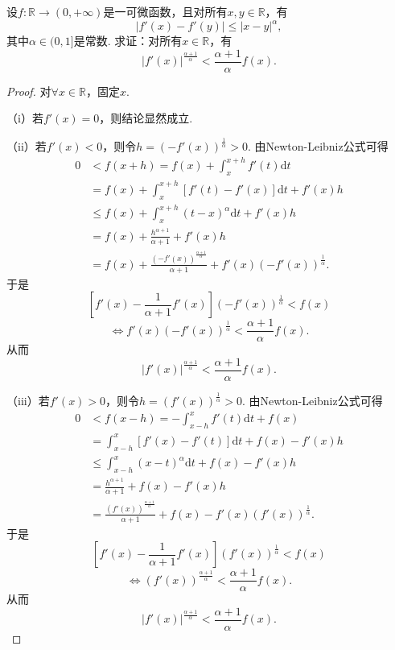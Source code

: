 \documentclass[../../main.tex]{subfiles}
\begin{document}
\begin{example}
设$f: \mathbb{R} \to (0, +\infty)$是一可微函数，且对所有$x, y \in \mathbb{R}$，有
$$|f'(x) - f'(y)| \leqslant |x - y|^\alpha,$$
其中$\alpha \in (0, 1]$是常数.
求证：对所有$x \in \mathbb{R}$，有
$$|f'(x)|^{\frac{\alpha + 1}{\alpha}} < \frac{\alpha + 1}{\alpha} f(x).$$
\end{example}
\begin{proof}
对$\forall x \in \mathbb{R}$，固定$x$.

（i）若$f'(x) = 0$，则结论显然成立.

（ii）若$f'(x) < 0$，则令$h = \left( -f'(x) \right)^{\frac{1}{\alpha}} > 0$. 由Newton-Leibniz公式可得
\begin{align*}
0 &< f(x + h) = f(x) + \int_x^{x + h} f'(t) \mathrm{d}t \\
&= f(x) + \int_x^{x + h} \left[ f'(t) - f'(x) \right] \mathrm{d}t + f'(x) h \\
&\leqslant f(x) + \int_x^{x + h} \left( t - x \right)^{\alpha} \mathrm{d}t + f'(x) h \\
&= f(x) + \frac{h^{\alpha + 1}}{\alpha + 1} + f'(x) h \\
&= f(x) + \frac{\left( -f'(x) \right)^{\frac{\alpha + 1}{\alpha}}}{\alpha + 1} + f'(x) \left( -f'(x) \right)^{\frac{1}{\alpha}}.
\end{align*}
于是
$$\left[ f'(x) - \frac{1}{\alpha + 1} f'(x) \right] \left( -f'(x) \right)^{\frac{1}{\alpha}} < f(x)$$
$$\Longleftrightarrow f'(x) \left( -f'(x) \right)^{\frac{1}{\alpha}} < \frac{\alpha + 1}{\alpha} f(x).$$
从而
$$\left| f'(x) \right|^{\frac{\alpha + 1}{\alpha}} < \frac{\alpha + 1}{\alpha} f(x).$$

（iii）若$f'(x) > 0$，则令$h = \left( f'(x) \right)^{\frac{1}{\alpha}} > 0$. 由Newton-Leibniz公式可得
\begin{align*}
0 &< f(x - h) = -\int_{x - h}^x f'(t) \mathrm{d}t + f(x) \\
&= \int_{x - h}^x \left[ f'(x) - f'(t) \right] \mathrm{d}t + f(x) - f'(x) h \\
&\leqslant \int_{x - h}^x \left( x - t \right)^{\alpha} \mathrm{d}t + f(x) - f'(x) h \\
&= \frac{h^{\alpha + 1}}{\alpha + 1} + f(x) - f'(x) h \\
&= \frac{\left( f'(x) \right)^{\frac{\alpha + 1}{\alpha}}}{\alpha + 1} + f(x) - f'(x) \left( f'(x) \right)^{\frac{1}{\alpha}}.
\end{align*}
于是
$$\left[ f'(x) - \frac{1}{\alpha + 1} f'(x) \right] \left( f'(x) \right)^{\frac{1}{\alpha}} < f(x)$$
$$\Longleftrightarrow \left( f'(x) \right)^{\frac{\alpha + 1}{\alpha}} < \frac{\alpha + 1}{\alpha} f(x).$$
从而
$$\left| f'(x) \right|^{\frac{\alpha + 1}{\alpha}} < \frac{\alpha + 1}{\alpha} f(x).$$

\end{proof}
\end{document}
